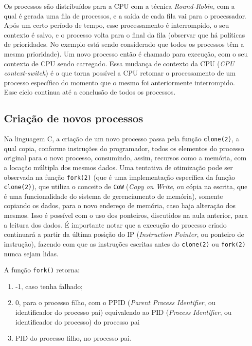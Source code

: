Os processos são distribuídos para a CPU com a técnica
\emph{Round-Robin}, com a qual é gerada uma fila de processos, e a saída
de cada fila vai para o processador. Após um certo período de tempo,
esse processamento é interrompido, o seu contexto é salvo, e o processo
volta para o final da fila (observar que há políticas de prioridades. No
exemplo está sendo considerado que todos os processos têm a mesma
prioridade). Um novo processo então é chamado para execução, com o seu
contexto de CPU sendo carregado. Essa mudança de contexto da CPU
(\emph{CPU context-switch}) é o que torna possível a CPU retomar o
processamento de um processo específico do momento que o mesmo foi
anteriormente interrompido. Esse ciclo continua até a conclusão de todos
os processos.

\hypertarget{criauxe7uxe3o-de-novos-processos}{%
\subsection{Criação de novos processos}\label{criauxe7uxe3o-de-novos-processos}}

Na linguagem C, a criação de um novo processo passa pela função
\texttt{clone(2)}, a qual copia, conforme instruções do programador,
todos os elementos do processo original para o novo processo,
consumindo, assim, recursos como a memória, com a locação múltipla dos
mesmos dados. Uma tentativa de otimização pode ser observada na função
\texttt{fork(2)} (que é uma implementação específica da função
\texttt{clone(2)}), que utiliza o conceito de \texttt{CoW} (\emph{Copy
on Write}, ou cópia na escrita, que é uma funcionalidade do sistema de
gerenciamento de memória), somente copiando os dados, para o novo
endereço de memória, caso haja alteração dos mesmos. Isso é possível com
o uso dos ponteiros, discutidos na aula anterior, para a leitura dos
dados. É importante notar que a execução do processo criado continuará a
partir da última posição do IP (\emph{Instruction Pointer}, ou ponteiro
de instrução), fazendo com que as instruções escritas antes do
\texttt{clone(2)} ou \texttt{fork(2)} nunca sejam lidas.

A função \texttt{fork()} retorna:

\begin{enumerate}
\def\labelenumi{\arabic{enumi}.}

\item
  -1, caso tenha falhado;
\item
  0, para o processo filho, com o PPID (\emph{Parent Process
  Identifier}, ou identificador do processo pai) equivalendo ao PID
  (\emph{Process Identifier}, ou identificador do processo) do processo
  pai
\item
  PID do processo filho, no processo pai.
\end{enumerate}


